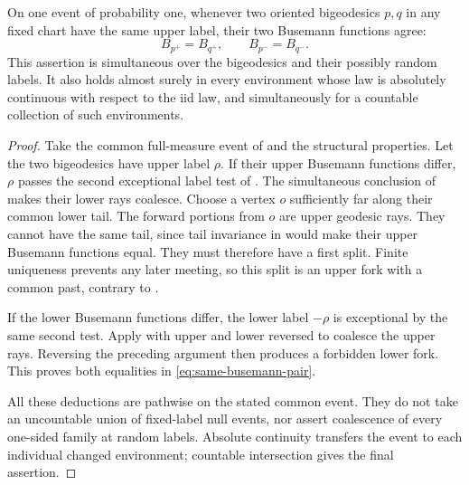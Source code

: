 \begin{corollary}
\label{cor:same-busemann}
On one event of probability one, whenever two oriented bigeodesics $p,q$
in any fixed chart have the same upper label, their two Busemann
functions agree:
\begin{equation}\label{eq:same-busemann-pair}
 B_{p^+}=B_{q^+},\qquad B_{p^-}=B_{q^-}.
\end{equation}
This assertion is simultaneous over the bigeodesics and their possibly
random labels.  It also holds almost surely in every environment whose
law is absolutely continuous with respect to the iid law, and
simultaneously for a countable collection of such environments.
\end{corollary}

\begin{proof}
Take the common full-measure event of
 and the structural
properties.  Let the two bigeodesics have upper label $\rho$.  If their
upper Busemann functions differ, $\rho$ passes the second exceptional
label test of .  The simultaneous
conclusion of  makes their lower rays
coalesce.  Choose a vertex $o$ sufficiently far along their common lower
tail.  The forward portions from $o$ are upper geodesic rays.  They
cannot have the same tail, since tail invariance in
 would make their upper Busemann functions
equal.  They must therefore have a first split.  Finite uniqueness
prevents any later meeting, so this split is an upper fork with a common
past, contrary to .

If the lower Busemann functions differ, the lower label $-\rho$ is
exceptional by the same second test.  Apply
 with upper and lower reversed to
coalesce the upper rays.  Reversing the preceding argument then produces
a forbidden lower fork.  This proves both equalities in
\eqref{eq:same-busemann-pair}.

All these deductions are pathwise on the stated common event.  They do
not take an uncountable union of fixed-label null events, nor assert
coalescence of every one-sided family at random labels.  Absolute
continuity transfers the event to each individual changed environment;
countable intersection gives the final assertion.
\end{proof}
